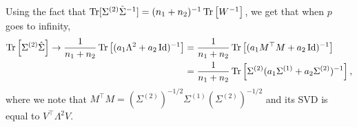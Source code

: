 Using the fact that $\operatorname{Tr}[\Sigma^{(2)} \hat{\Sigma}^{-1}] = (n_1 + n_2)^{-1}\operatorname{Tr}\left[W^{-1}\right] $, we get that when $p$ goes to infinity, %
\begin{align*}
  \operatorname{Tr}\left[\Sigma^{(2)} \hat{\Sigma}\right] \rightarrow \frac{1}{n_1+n_2}\operatorname{Tr}\left[(a_1 \Lambda^2 + a_2\operatorname{Id})^{-1}\right] &= \frac1{n_1+n_2}\operatorname{Tr}\left[(a_1 M^{\top}M + a_2 \operatorname{Id})^{-1}\right] \\
  &=\frac{1}{n_1+n_2} \operatorname{Tr}\left[\Sigma^{(2)} (a_1 \Sigma^{(1)} + a_2 \Sigma^{(2)})^{-1}\right],
  \end{align*}
where we note that $M^\top M = (\Sigma^{(2)})^{-1/2} \Sigma^{(1)} (\Sigma^{(2)})^{-1/2}$ and its SVD is equal to $V^{\top}\Lambda^2 V$.




